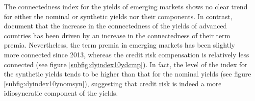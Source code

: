 \begin{appendices}
The connectedness index for the yields of emerging markets shows no clear trend for either the nominal or synthetic yields nor their components. 
In contrast, \cite{ACDM:2019} document that the increase in the connectedness of the yields of advanced countries has been driven by an increase in the connectedness of their term premia.
Nevertheless, the term premia in emerging markets has been slightly more connected since 2013, whereas the credit risk compensation is relatively less connected (see figure \ref{subfig:dyindex10ydcmp}).
In fact, the level of the index for the synthetic yields tends to be higher than that for the nominal yields (see figure \ref{subfig:dyindex10ynomsyn}), suggesting that credit risk is indeed a more idiosyncratic component of the yields.


\end{appendices}
